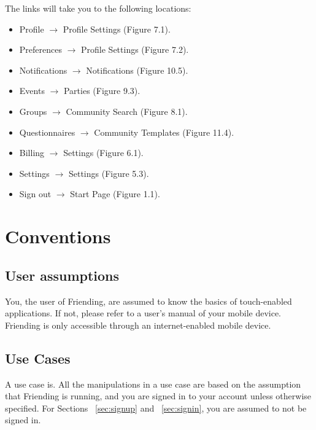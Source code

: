\documentclass[a4paper,11pt,titlepage]{scrartcl}
\newcommand{\textapp}[1]{{\fontfamily{cmss}\selectfont#1}}
\newcommand{\Friending}{\textapp{Friending}}
\newcommand*{\fileHomepage}{homepage}
\newcommand*{\fileNavigation}{navigation-menu}
\newcommand*{\AssetsPath}{../assets}%
\newcommand{\appscreenshot}[4]{
}
\begin{document}
\appscreenshot{\fileNavigation}{Navigation Menu}{The primary navigation method}{fig:navigation}

The links will take you to the following locations:

\begin{itemize}
\item Profile $\rightarrow$ Profile Settings (Figure 7.1).
\item Preferences $\rightarrow$ Profile Settings (Figure 7.2).
\item Notifications $\rightarrow$ Notifications (Figure 10.5).
\item Events $\rightarrow$ Parties (Figure 9.3).
\item Groups $\rightarrow$ Community Search (Figure 8.1).
\item Questionnaires $\rightarrow$ Community Templates (Figure 11.4).
\item Billing $\rightarrow$ Settings (Figure 6.1).
\item Settings $\rightarrow$ Settings (Figure 5.3).
\item Sign out $\rightarrow$ Start Page (Figure 1.1).
\end{itemize}

\appscreenshot{\fileHomepage}{Home}{A populated home page}{fig:home}

\clearpage
\section{Conventions}
\label{sec:conventions}

\subsection{User assumptions}
\label{sec:assumptions}
You, the user of \Friending{}, are assumed to know the basics of touch-enabled applications.  If not, please refer to a user’s manual of your mobile device.  \Friending{} is only accessible through an internet-enabled mobile device.

\subsection{Use Cases}
\label{sec:usecases}
A use case is.  All the manipulations in a use case are based on the assumption that \Friending{} is running, and you are signed in to your account unless otherwise specified.  For Sections ~\ref{sec:signup} and ~\ref{sec:signin}, you are assumed to not be signed in.  
\end{document}
